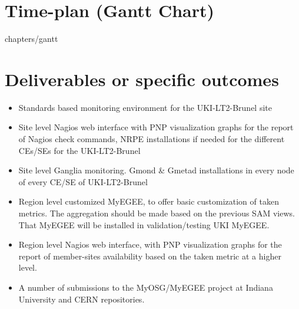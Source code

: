 \section[Time plan]{Time-plan (Gantt Chart)}

 {chapters/gantt}
\pagebreak
\section[Deliverables]{Deliverables or specific outcomes}

\begin{itemize}
  \item Standards based monitoring environment for the UKI-LT2-Brunel site
  \item Site level Nagios web interface with PNP visualization graphs for the report of Nagios check commands, NRPE installations if needed for the different CEs/SEs for the UKI-LT2-Brunel
  \item Site level Ganglia monitoring. Gmond \& Gmetad installations in every node of every CE/SE of UKI-LT2-Brunel
  \item Region level customized MyEGEE, to offer basic customization of taken metrics. The aggregation should be made based on the previous SAM views. That MyEGEE will be installed in validation/testing UKI MyEGEE.
  \item Region level Nagios web interface, with PNP visualization graphs for the report of member-sites availability based on the taken metric at a higher level.
  \item A number of submissions to the MyOSG/MyEGEE project at Indiana University and CERN repositories.
\end{itemize}
